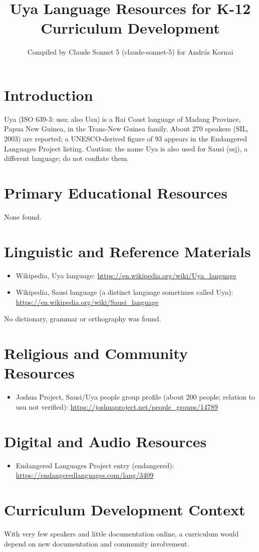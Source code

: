 \documentclass[12pt]{article}
\title{Uya Language Resources for K-12 Curriculum Development}
\author{Compiled by Claude Sonnet 5 (claude-sonnet-5) for Andr\'as Kornai}
\date{}
\begin{document}
\maketitle

\section{Introduction}
Uya (ISO 639-3: usu; also Usu) is a Rai Coast language of Madang Province, Papua New Guinea, in the Trans-New Guinea family. About 270 speakers (SIL, 2003) are reported; a UNESCO-derived figure of 93 appears in the Endangered Languages Project listing. Caution: the name Uya is also used for Sausi (ssj), a different language; do not conflate them.

\section{Primary Educational Resources}
None found.

\section{Linguistic and Reference Materials}
\begin{itemize}
\item Wikipedia, Uya language: \url{https://en.wikipedia.org/wiki/Uya_language}
\item Wikipedia, Sausi language (a distinct language sometimes called Uya): \url{https://en.wikipedia.org/wiki/Sausi_language}
\end{itemize}
No dictionary, grammar or orthography was found.

\section{Religious and Community Resources}
\begin{itemize}
\item Joshua Project, Sausi/Uya people group profile (about 200 people; relation to usu not verified): \url{https://joshuaproject.net/people_groups/14789}
\end{itemize}

\section{Digital and Audio Resources}
\begin{itemize}
\item Endangered Languages Project entry (endangered): \url{https://endangeredlanguages.com/lang/3409}
\end{itemize}

\section{Curriculum Development Context}
With very few speakers and little documentation online, a curriculum would depend on new documentation and community involvement.
\end{document}
